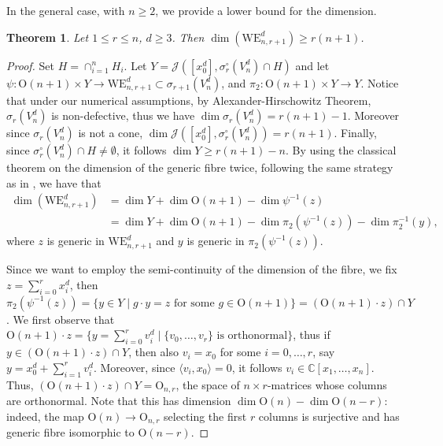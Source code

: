 \documentclass{amsart}
\newtheorem{theorem}{Theorem}
\numberwithin{theorem}{section}
\theoremstyle{definition}
\newcommand{\CC}{\mathbb{C}}
\begin{document}
In the general case, with $n\geq 2$, we provide a lower bound for the dimension. 


\begin{theorem}\label{teo:dimWEn}
    Let $1\leq r\leq n$, $d\geq 3$. Then $ \dim (\mathrm{WE}_{n,r+1}^d)\geq r(n+1)$. 
\end{theorem}

\begin{proof}

    Set $H=\cap_{i=1}^nH_i$. Let $Y=\mathcal J([x_0^d],\sigma_r^\circ(V_n^d)\cap H)$ and let $\psi:\mathrm{O}(n+1)\times Y\to \mathrm{WE}_{n,r+1}^d\subset \sigma_{r+1}(V_n^d)$, and $\pi_2:\mathrm{O}(n+1)\times Y\to Y$. Notice that under our numerical assumptions, by Alexander-Hirschowitz Theorem, $\sigma_r(V_n^d)$ is non-defective, thus we have $\dim \sigma_r(V^d_n) = r(n+1)-1$. Moreover since $\sigma_r(V_n^d)$ is not a cone,  $\dim \mathcal{J}([x_0^d],\sigma_r^\circ(V_n^d)) = r(n+1)$. Finally, since $\sigma_r^\circ(V_n^d)\cap H\neq \emptyset$, it follows $\dim Y \geq r(n+1)-n$. By using the classical theorem on the dimension of the generic fibre twice, following the same strategy as in , we have that
    \begin{align*}
        \dim(\mathrm{WE}_{n,r+1}^d)& = \dim Y+\dim \mathrm{O}(n+1)-\dim \psi^{-1}(z)\\
        & = \dim Y+\dim \mathrm{O}(n+1)-\dim \pi_2(\psi^{-1}(z))-\dim \pi_2^{-1}(y),
    \end{align*}
    where $z$ is generic in $\mathrm{WE}_{n,r+1}^d$ and $y$ is generic in $\pi_2(\psi^{-1}(z))$.
    
    Since we want to employ the semi-continuity of the dimension of the fibre, we fix $z=\sum_{i=0}^rx_i^d$, then $\pi_2(\psi^{-1}(z))=\{y\in Y\mid g\cdot y=z \text{ for some $g\in \mathrm{O}(n+1)$}\} = (\mathrm{O}(n+1)\cdot z)\cap Y$.
    We first observe that $\mathrm{O}(n+1)\cdot z=\{y=\sum_{i=0}^r v_i^d\mid \{v_0,\dots,v_r\} \text{ is orthonormal}\}$, thus if $y\in(\mathrm{O}(n+1)\cdot z)\cap Y$, then also $v_i=x_0$ for some $i=0,\dots,r$, say $y=x_0^d+\sum_{i=1}^r v_i^d$. Moreover, since $\langle v_i,x_0\rangle=0$, it follows $v_i\in \CC[x_1,\dots,x_n]$. 
    Thus, $(\mathrm{O}(n+1)\cdot z)\cap Y = \mathrm{O}_{n,r}$, the space of $n \times r$-matrices whose columns are orthonormal. Note that this has dimension $\dim\mathrm O(n)-\dim \mathrm{O}(n-r)$: indeed, the map $\mathrm O(n) \rightarrow \mathrm O_{n,r}$ selecting the first $r$ columns is surjective and has generic fibre isomorphic to $\mathrm O(n-r)$.



\end{proof}
\end{document}
